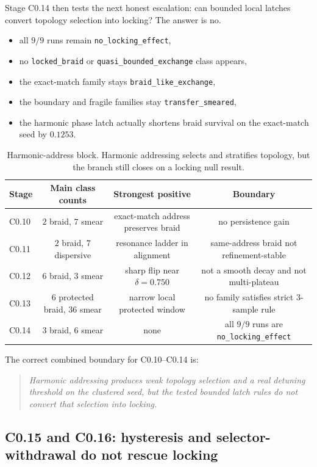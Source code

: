 \documentclass[11pt]{article}
\begin{document}
Stage C0.14 then tests the next honest escalation: can bounded local latches convert topology selection into locking? The answer is no.
\begin{itemize}
\item all $9/9$ runs remain \texttt{no\_locking\_effect},
\item no \texttt{locked\_braid} or \texttt{quasi\_bounded\_exchange} class appears,
\item the exact-match family stays \texttt{braid\_like\_exchange},
\item the boundary and fragile families stay \texttt{transfer\_smeared},
\item the harmonic phase latch actually shortens braid survival on the exact-match seed by $0.1253$.
\end{itemize}

\begin{table}[t]
\centering
\scriptsize
\begin{tabular}{@{}lccc@{}}
\toprule
Stage & Main class counts & Strongest positive & Boundary \\
\midrule
C0.10 & $2$ braid, $7$ smear & exact-match address preserves braid & no persistence gain \\
C0.11 & $2$ braid, $7$ dispersive & resonance ladder in alignment & same-address braid not refinement-stable \\
C0.12 & $6$ braid, $3$ smear & sharp flip near $\delta = 0.750$ & not a smooth decay and not multi-plateau \\
C0.13 & $6$ protected braid, $36$ smear & narrow local protected window & no family satisfies strict 3-sample rule \\
C0.14 & $3$ braid, $6$ smear & none & all $9/9$ runs are \texttt{no\_locking\_effect} \\
\bottomrule
\end{tabular}
\caption{Harmonic-address block. Harmonic addressing selects and stratifies topology, but the branch still closes on a locking null result.}
\label{tab:c0c}
\end{table}

The correct combined boundary for C0.10--C0.14 is:
\begin{quote}
\emph{Harmonic addressing produces weak topology selection and a real detuning threshold on the clustered seed, but the tested bounded latch rules do not convert that selection into locking.}
\end{quote}

\subsection{C0.15 and C0.16: hysteresis and selector-withdrawal do not rescue locking}
\end{document}
